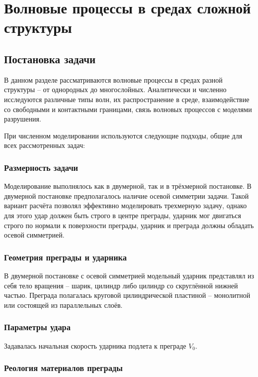 \section{Волновые процессы в средах сложной структуры}

\subsection{Постановка задачи}

В данном разделе рассматриваются волновые процессы в средах разной структуры -- от однородных до многослойных. Аналитически и численно исследуются различные типы волн, их распространение в среде, взаимодействие со свободными и контактными границами, связь волновых процессов с моделями разрушения.

При численном моделировании используются следующие подходы, общие для всех рассмотренных задач:

\subsubsection*{Размерность задачи}

Моделирование выполнялось как в двумерной, так и в трёхмерной постановке. В двумерной постановке предполагалось наличие осевой симметрии задачи. Такой вариант расчёта позволял эффективно моделировать трехмерную задачу, однако для этого удар должен быть строго в центре преграды, ударник мог двигаться строго по нормали к поверхности преграды, ударник и преграда должны обладать осевой симметрией.

\subsubsection*{Геометрия преграды и ударника}

В двумерной постановке с осевой симметрией модельный ударник представлял из себя тело вращения -- шарик, цилиндр либо цилиндр со скруглённой нижней частью. Преграда полагалась круговой цилиндрической пластиной -- монолитной или состоящей из параллельных слоёв.

\subsubsection*{Параметры удара}

Задавалась начальная скорость ударника подлета к преграде $V_0$.

\subsubsection*{Реология материалов преграды}

